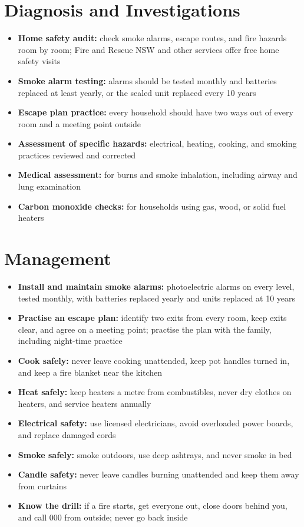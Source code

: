 \section*{Diagnosis and Investigations}
\begin{itemize}
    \item \textbf{Home safety audit:} check smoke alarms, escape routes, and fire hazards room by room; Fire and Rescue NSW and other services offer free home safety visits
    \item \textbf{Smoke alarm testing:} alarms should be tested monthly and batteries replaced at least yearly, or the sealed unit replaced every 10 years
    \item \textbf{Escape plan practice:} every household should have two ways out of every room and a meeting point outside
    \item \textbf{Assessment of specific hazards:} electrical, heating, cooking, and smoking practices reviewed and corrected
    \item \textbf{Medical assessment:} for burns and smoke inhalation, including airway and lung examination
    \item \textbf{Carbon monoxide checks:} for households using gas, wood, or solid fuel heaters
\end{itemize}

\section*{Management}
\begin{itemize}
    \item \textbf{Install and maintain smoke alarms:} photoelectric alarms on every level, tested monthly, with batteries replaced yearly and units replaced at 10 years
    \item \textbf{Practise an escape plan:} identify two exits from every room, keep exits clear, and agree on a meeting point; practise the plan with the family, including night-time practice
    \item \textbf{Cook safely:} never leave cooking unattended, keep pot handles turned in, and keep a fire blanket near the kitchen
    \item \textbf{Heat safely:} keep heaters a metre from combustibles, never dry clothes on heaters, and service heaters annually
    \item \textbf{Electrical safety:} use licensed electricians, avoid overloaded power boards, and replace damaged cords
    \item \textbf{Smoke safely:} smoke outdoors, use deep ashtrays, and never smoke in bed
    \item \textbf{Candle safety:} never leave candles burning unattended and keep them away from curtains
    \item \textbf{Know the drill:} if a fire starts, get everyone out, close doors behind you, and call 000 from outside; never go back inside
\end{itemize}

